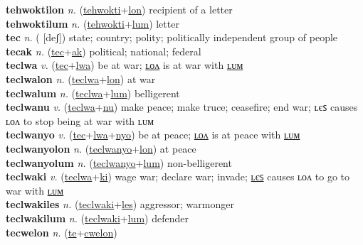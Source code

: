 \textbf{tehwoktilon} \textit{n.} (\hyperref[tehwokti]{tehwokti}+\hyperref[lon]{lon})
recipient of a letter \label{tehwoktilon} \\
\textbf{tehwoktilum} \textit{n.} (\hyperref[tehwokti]{tehwokti}+\hyperref[lum]{lum})
letter \label{tehwoktilum} \\
\textbf{tec} \textit{n.} ( [deʃ])
state; country; polity; politically independent group of people \label{tec} \\
\textbf{tecak} \textit{n.} (\hyperref[tec]{tec}+\hyperref[ak]{ak})
political; national; federal \label{tecak} \\
\textbf{teclwa} \textit{v.} (\hyperref[tec]{tec}+\hyperref[lwa]{lwa})
be at war; \hyperref[teclwalon]{ʟᴏᴧ} is at war with \hyperref[teclwalum]{ʟᴜᴍ} \label{teclwa} \\
\textbf{teclwalon} \textit{n.} (\hyperref[teclwa]{teclwa}+\hyperref[lon]{lon})
at war \label{teclwalon} \\
\textbf{teclwalum} \textit{n.} (\hyperref[teclwa]{teclwa}+\hyperref[lum]{lum})
belligerent \label{teclwalum} \\
\textbf{teclwanu} \textit{v.} (\hyperref[teclwa]{teclwa}+\hyperref[nu]{nu})
make peace; make truce; ceasefire; end war; ʟєꜱ causes ʟᴏᴧ to stop being at war with ʟᴜᴍ \label{teclwanu} \\
\textbf{teclwanyo} \textit{v.} (\hyperref[tec]{tec}+\hyperref[lwa]{lwa}+\hyperref[nyo]{nyo})
be at peace; \hyperref[teclwanyolon]{ʟᴏᴧ} is at peace with \hyperref[teclwanyolum]{ʟᴜᴍ} \label{teclwanyo} \\
\textbf{teclwanyolon} \textit{n.} (\hyperref[teclwanyo]{teclwanyo}+\hyperref[lon]{lon})
at peace \label{teclwanyolon} \\
\textbf{teclwanyolum} \textit{n.} (\hyperref[teclwanyo]{teclwanyo}+\hyperref[lum]{lum})
non-belligerent \label{teclwanyolum} \\
\textbf{teclwaki} \textit{v.} (\hyperref[teclwa]{teclwa}+\hyperref[ki]{ki})
wage war; declare war; invade; \hyperref[teclwakiles]{ʟєꜱ} causes ʟᴏᴧ to go to war with \hyperref[teclwakilum]{ʟᴜᴍ} \label{teclwaki} \\
\textbf{teclwakiles} \textit{n.} (\hyperref[teclwaki]{teclwaki}+\hyperref[les]{les})
aggressor; warmonger \label{teclwakiles} \\
\textbf{teclwakilum} \textit{n.} (\hyperref[teclwaki]{teclwaki}+\hyperref[lum]{lum})
defender \label{teclwakilum} \\
\textbf{tecwelon} \textit{n.} (\hyperref[te]{te}+\hyperref[cwelon]{cwelon})
